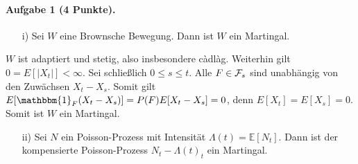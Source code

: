 \documentclass{article}
\begin{document}
\paragraph{Aufgabe 1 \textnormal{(4 Punkte)}.}
\begin{itemize}
\item [i)] Sei $W$ eine Brownsche Bewegung.
  Dann ist $W$ ein Martingal.
\end{itemize}
$W$ ist adaptiert und stetig, also insbesondere càdlàg.
Weiterhin gilt $0=E[|X_t|]<\infty$.
Sei schließlich $0\leq s\leq t$.
Alle $F\in{\cal F}_s$ sind unabhängig von den Zuwächsen $X_t-X_s$.
Somit gilt $E[\mathbbm{1}_F(X_t-X_s)]=P(F)E[X_t-X_s]=0$, denn $E[X_t]=E[X_s]=0$.
Somit ist $W$ ein Martingal.
\begin{itemize}
\item [ii)] Sei $N$ ein Poisson-Prozess mit Intensität $\Lambda(t)=\mathbb{E}[N_t]$.
  Dann ist der kompensierte Poisson-Prozess $N_t-\Lambda(t)_t$ ein Martingal.
\end{itemize}

\end{document}
